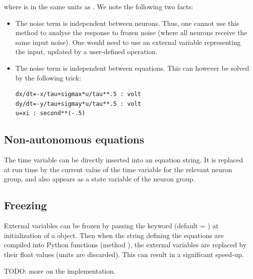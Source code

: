 \documentclass[letterpaper,10pt,english]{manual}
\begin{document}
where  is in the same units as . We note the following two facts:
\begin{itemize}
\item {} 
The noise term is independent between neurons. Thus, one cannot use this method to analyse
the response to frozen noise (where all neurons receive the same input noise). One would need
to use an external variable representing the input, updated by a user-defined operation.

\item {} 
The noise term is independent between equations. This can however be solved by the following
trick:

\begin{Verbatim}[commandchars=@\[\]]
dx/dt=-x/tau+sigmax*u/tau**.5 : volt
dy/dt=-y/tau+sigmay*u/tau**.5 : volt
u=xi : second**(-.5)
\end{Verbatim}

\end{itemize}

\subsection{Non-autonomous equations}

The time variable  can be directly inserted into an equation string.
It is replaced at run time by the current value of the time variable for the relevant
neuron group, and also appears as a state variable of the neuron group.

\subsection{Freezing}

External variables can be frozen by passing the keyword 
(default = ) at initialization of a \hyperlink{brian.NeuronGroup}{} object.
Then when the string defining the equations are compiled into Python functions
(method ),
the external variables are replaced by their float values (units are discarded).
This can result in a significant speed-up.

TODO: more on the implementation.
\end{document}
